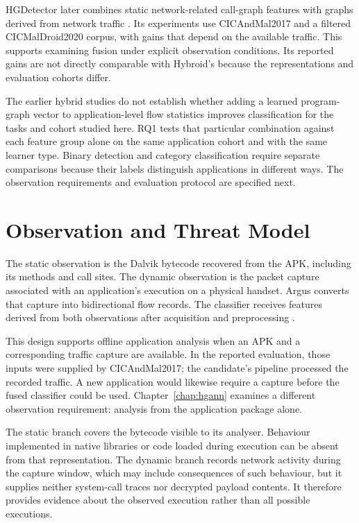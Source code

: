 HGDetector later combines static network-related call-graph features with graphs derived from
network traffic \cite{feng2025hgdetector}. Its experiments use CICAndMal2017 and a filtered
CICMalDroid2020 corpus, with gains that depend on the available traffic. This supports examining
fusion under explicit observation conditions. Its reported gains are not directly comparable
with Hybroid's because the representations and evaluation cohorts differ.

The earlier hybrid studies do not establish whether adding a learned program-graph vector to
application-level flow statistics improves classification for the tasks and cohort studied here.
RQ1 tests
that particular combination against each feature group alone on the same application cohort
and with the same learner type. Binary detection and category classification require separate
comparisons because their labels distinguish applications in different ways. The observation
requirements and evaluation protocol are specified next.

\section{Observation and Threat Model}
\label{sec:hybroid:3}

The static observation is the Dalvik bytecode recovered from the APK, including its methods and
call sites. The dynamic observation is the packet capture associated with an application's
execution on a physical handset. Argus converts that capture into bidirectional flow records.
The classifier receives features derived from both observations after acquisition and
preprocessing \cite{norouzian2021hybroid}.

This design supports offline application analysis when an APK and a corresponding traffic
capture are available. In the reported evaluation, those inputs were supplied by CICAndMal2017;
the candidate's pipeline processed the recorded traffic. A new application would likewise
require a capture before the fused classifier could be used. Chapter~\ref{chap:hgann}
examines a different observation requirement: analysis from the application package alone.

The static branch covers the bytecode visible to its analyser. Behaviour implemented in native
libraries or code loaded during execution can be absent from that representation. The dynamic
branch records network activity during the capture window, which may include consequences of
such behaviour, but it supplies neither system-call traces nor decrypted payload contents.
It therefore provides evidence about the observed execution rather than all possible executions.

